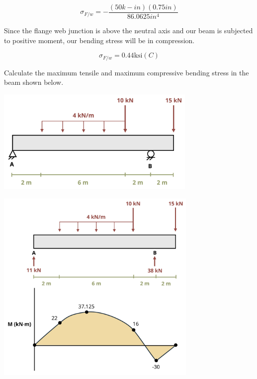 \documentclass[
  letterpaper,
  DIV=11,
  numbers=noendperiod]{scrreprt}
\begin{document}
\begin{tcolorbox}
\[
\sigma_{F / w}=-\frac{(50 k-i n)(0.75 i n)}{86.0625 i n^4}
\]

Since the flange web junction is above the neutral axis and our beam is
subjected to positive moment, our bending stress will be in compression.

\[
\sigma_{F / w}=0.44 \mathrm{ksi}(C)
\]

\end{tcolorbox}

\begin{tcolorbox}[enhanced jigsaw, colbacktitle=quarto-callout-note-color!10!white, title={Example 9.2: Bending stress problem\,}, coltitle=black, leftrule=.75mm, rightrule=.15mm, opacityback=0, breakable, colframe=quarto-callout-note-color-frame, left=2mm, arc=.35mm, colback=white, bottomrule=.15mm, bottomtitle=1mm, toptitle=1mm, titlerule=0mm, opacitybacktitle=0.6, toprule=.15mm]

Calculate the maximum tensile and maximum compressive bending stress in
the beam shown below.

\begin{center}
\includegraphics[width=3.79167in,height=\textheight]{images/CH9 PNGs/Example 9.2 part 1.png}
\end{center}

\begin{center}
\includegraphics[width=3.8125in,height=\textheight]{images/CH9 PNGs/Example 9.2 part 2.png}
\end{center}


\end{tcolorbox}
\end{document}
